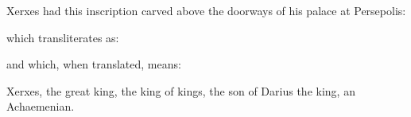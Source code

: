 \documentclass{article}
\begin{document}
\newcommand{\xerxes}{%
 \Oxa\Osva\Oya\Oa\Ora\Osva\Oa\Owd\-%
 \Oxa\Osva\Oa\Oya\Otha\Oi\Oya\Owd\-%
 \Ova\Oza\Ora\Oka\Owd\-%
 \Oxa\Osva\Oa\Oya\Otha\Oi\Oya\Owd\-%
 \Oxa\Osva\Oa\Oya\Otha\Oi\Oya\Oa\Ona\Oa\Oma\Owd\-%
 \Oda\Oa\Ora\Oya\Ova\Oha\Ou\Osva\Owd\-%
 \Oxa\Osva\Oa\Oya\Otha\Oi\Oya\Oha\Oya\Oa\Owd\-%
 \Opa\Ou\Occa\Owd\-%
 \Oha\Oxa\Oa\Oma\Ona\Oi\Osva\Oi\Oya\Owd}
 

    Xerxes had this inscription carved above the doorways of his palace
at Persepolis:
\begin{center}
\textcopsn{\xerxes}
\end{center}
which transliterates as: 
\begin{center}
\translitcopsn{\xerxes} 
\end{center}
and which, when translated, means: 
\begin{center}
Xerxes, the great king, the king of kings, the son of Darius the king,
an Achaemenian.
\end{center}
\end{document}
